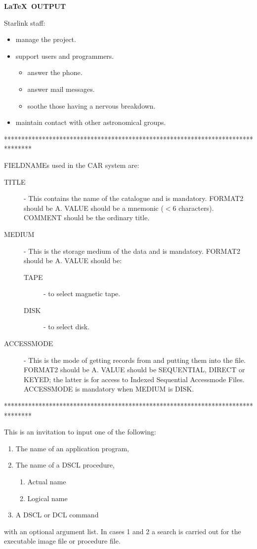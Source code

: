 \newpage

\begin{center}
{\bf \LaTeX\ OUTPUT}
\end{center}

Starlink staff:
\begin{itemize}
\item manage the project.
\item support users and programmers.
\begin{itemize}
\item answer the phone.
\item answer mail messages.
\item soothe those having a nervous breakdown.
\end{itemize}
\item maintain contact with other astronomical groups.
\end{itemize}

********************************************************************************

FIELDNAMEs used in the CAR system are:
\begin{description}
\item [TITLE] -
This contains the name of the catalogue and is mandatory.
FORMAT2 should be A.
VALUE should be a mnemonic ($<$6 characters).
COMMENT should be the ordinary title.
\item [MEDIUM] -
This is the storage medium of the data and is mandatory.
FORMAT2 should be A.
VALUE should be:
\begin{description}
\item [TAPE] -
to select magnetic tape.
\item [DISK] -
to select disk.
\end{description}
\item [ACCESSMODE] -
This is the mode of getting records from and putting them into the file.
FORMAT2 should be A.
VALUE should be SEQUENTIAL, DIRECT or KEYED; the latter is for access to
Indexed Sequential Accessmode Files.
ACCESSMODE is mandatory when MEDIUM is DISK.
\end{description}

********************************************************************************

This is an invitation to input one of the following:
\begin{enumerate}
\item The name of an application program,
\item The name of a DSCL procedure,
\begin{enumerate}
\item Actual name
\item Logical name
\end{enumerate}
\item A DSCL or DCL command
\end{enumerate}
with an optional argument list.
In cases 1 and 2 a search is carried out for the executable image file or
procedure file.

